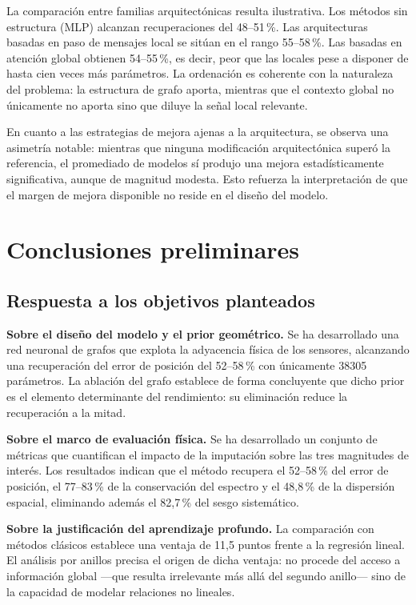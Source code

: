 La comparación entre familias arquitectónicas resulta ilustrativa. Los métodos sin estructura (MLP)
alcanzan recuperaciones del 48--51\,\%. Las arquitecturas basadas en paso de mensajes local se sitúan
en el rango 55--58\,\%. Las basadas en atención global obtienen 54--55\,\%, es decir, peor que las
locales pese a disponer de hasta cien veces más parámetros. La ordenación es coherente con la
naturaleza del problema: la estructura de grafo aporta, mientras que el contexto global no
únicamente no aporta sino que diluye la señal local relevante.

En cuanto a las estrategias de mejora ajenas a la arquitectura, se observa una asimetría notable:
mientras que ninguna modificación arquitectónica superó la referencia, el promediado de modelos sí
produjo una mejora estadísticamente significativa, aunque de magnitud modesta. Esto refuerza la
interpretación de que el margen de mejora disponible no reside en el diseño del modelo.


\section{Conclusiones preliminares}
\label{sec:conclusiones}

\subsection{Respuesta a los objetivos planteados}

\textbf{Sobre el diseño del modelo y el prior geométrico.} Se ha desarrollado una red neuronal de
grafos que explota la adyacencia física de los sensores, alcanzando una recuperación del error de
posición del 52--58\,\% con únicamente \num{38305} parámetros. La ablación del grafo establece de
forma concluyente que dicho prior es el elemento determinante del rendimiento: su eliminación reduce
la recuperación a la mitad.

\textbf{Sobre el marco de evaluación física.} Se ha desarrollado un conjunto de métricas que
cuantifican el impacto de la imputación sobre las tres magnitudes de interés. Los resultados indican
que el método recupera el 52--58\,\% del error de posición, el 77--83\,\% de la conservación del
espectro y el 48,8\,\% de la dispersión espacial, eliminando además el 82,7\,\% del sesgo
sistemático.

\textbf{Sobre la justificación del aprendizaje profundo.} La comparación con métodos clásicos
establece una ventaja de 11,5 puntos frente a la regresión lineal. El análisis por anillos precisa
el origen de dicha ventaja: no procede del acceso a información global ---que resulta irrelevante
más allá del segundo anillo--- sino de la capacidad de modelar relaciones no lineales.

